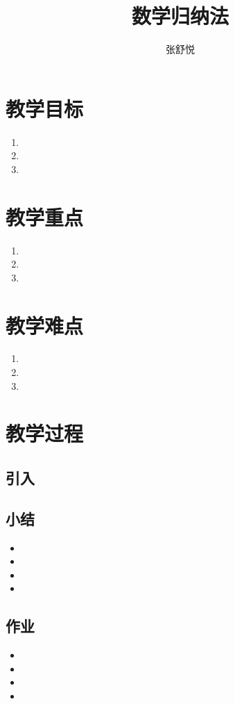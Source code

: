 \documentclass{article}
\begin{document}
\begin{CJK}{UTF8}{gkai}

\title{数学归纳法}
\date{}
\author{张舒悦}
\maketitle

\section{教学目标}
\begin{enumerate}
\item 
\item 
\item 
\end{enumerate}


\section{教学重点}
\begin{enumerate}
\item 
\item 
\item 
\end{enumerate}



\section{教学难点}
\begin{enumerate}
\item 
\item 
\item 
\end{enumerate}

\section{教学过程}

\subsection{引入}

\subsection{}

\subsection{小结}
\begin{itemize}
\item
\item
\item
\item 
\end{itemize}

\subsection{作业}
\begin{itemize}
\item
\item
\item
\item 
\end{itemize}


\end{CJK}
\end{document}
